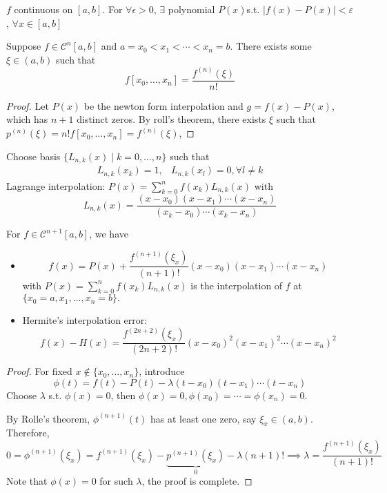 \begin{theorem}
$f$ continuous on $[a,b]$. For $\forall\epsilon>0$, $\exists$ polynomial $P(x)$s.t. $|f(x)-P(x)|<\varepsilon$, $\forall x\in[a,b]$
\end{theorem}
\begin{theorem}
Suppose $f\in\mathcal{C}^{n}[a,b]$ and $a=x_0<x_1<\cdots<x_n=b$. There exists some $\xi\in(a,b)$ such that 
\[
f[x_0,\dots,x_n]=\frac{f^{(n)}(\xi)}{n!}
\]
\end{theorem}
\begin{proof}
Let $P(x)$ be the newton form interpolation and $g=f(x)-P(x)$, which has $n+1$ distinct zeros. By roll's theorem, there exists $\xi$ such that $p^{(n)}(\xi)=n!f[x_0,\dots,x_n]=f^{(n)}(\xi)$,
\end{proof}

\begin{definition}
Choose basis $\{L_{n,k}(x)\mid k=0,\dots,n\}$ such that
\[
\begin{array}{ll}
L_{n,k}(x_k)=1,
&
L_{n,k}(x_l)=0,\forall l\ne k
\end{array}
\]
Lagrange interpolation: $P(x)=\sum_{k=0}^nf(x_k)L_{n,k}(x)$ with
\[
L_{n,k}(x)=\frac{(x-x_0)(x-x_1)\cdots(x-x_n)}{(x_k-x_0)\cdots(x_k-x_n)}
\]
\end{definition}

\begin{theorem}
For $f\in\mathcal{C}^{n+1}[a,b]$, we have
\begin{itemize}
\item
\[
f(x)=P(x)+\frac{f^{(n+1)}(\xi_x)}{(n+1)!}(x-x_0)(x-x_1)\cdots(x-x_n)
\]
with $P(x)=\sum_{k=0}^nf(x_k)L_{n,k}(x)$ is the interpolation of $f$ at $\{x_0=a,x_1,\dots,x_n=b\}.$
\item
Hermite's interpolation error:
\[
f(x)-H(x)=\frac{f^{(2n+2)}(\xi_x)}{(2n+2)!}(x-x_0)^2(x-x_1)^2\cdots(x-x_n)^2
\]
\end{itemize}
\end{theorem}
\begin{proof}
For fixed $x\notin\{x_0,\dots,x_n\}$, introduce
\[
\phi(t) = f(t) - P(t) - \lambda(t-x_0)(t-x_1)\cdots(t-x_n)
\]
Choose $\lambda$ s.t. $\phi(x)=0$, then $\phi(x)=0,\phi(x_0)=\cdots=\phi(x_n)=0$.

By Rolle's theorem, $\phi^{(n+1)}(t)$ has at least one zero, say $\xi_x\in(a,b)$. Therefore,
\[
0=\phi^{(n+1)}(\xi_x)=f^{(n+1)}(\xi_x)-\underbrace{p^{(n+1)}(\xi_x)}_{0}-\lambda(n+1)!\implies
\lambda=\frac{f^{(n+1)}(\xi_x)}{(n+1)!}
\]
Note that $\phi(x)=0$ for such $\lambda$, the proof is complete.
\end{proof}

